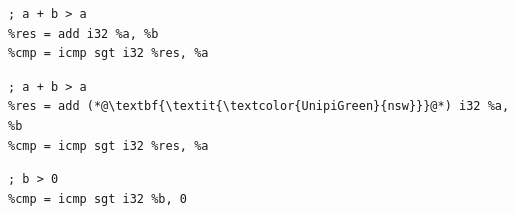 \newsavebox{\boxAddNoNsw}
\begin{lrbox}{\boxAddNoNsw}
\begin{minipage}{0.44\textwidth}
\begin{lstlisting}[style=llvmmono]
; a + b > a
%res = add i32 %a, %b
%cmp = icmp sgt i32 %res, %a
\end{lstlisting}
\end{minipage}
\end{lrbox}

\newsavebox{\boxAddNsw}
\begin{lrbox}{\boxAddNsw}
\begin{minipage}{0.44\textwidth}
\begin{lstlisting}[style=llvmmono]
; a + b > a
%res = add (*@\textbf{\textit{\textcolor{UnipiGreen}{nsw}}}@*) i32 %a, %b
%cmp = icmp sgt i32 %res, %a
\end{lstlisting}
\end{minipage}
\end{lrbox}

\newsavebox{\boxCmp}
\begin{lrbox}{\boxCmp}
\begin{minipage}{0.44\textwidth}
\begin{lstlisting}[style=llvmmono]
; b > 0
%cmp = icmp sgt i32 %b, 0
\end{lstlisting}
\end{minipage}
\end{lrbox}

